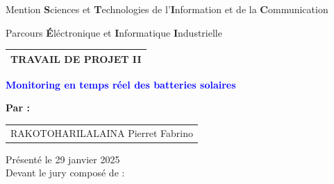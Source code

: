 \begin{titlepage}
	\begin{center}
		\begin{large}
			\large Mention {\textbf{S}ciences et \textbf{T}echnologies de l'\textbf{I}nformation et de la \textbf{C}ommunication} \\
		\end{large}
	\end{center}
	
	\begin{center}
		\begin{large}
			\large Parcours {\textbf{É}léctronique et \textbf{I}nformatique} \textbf{I}ndustrielle\\
		\end{large}
	\end{center}
	
	\vfill
	\begin{center}
		\begin{center}
			\begin{tabular}{c}
				
				
				\textbf{\small{TRAVAIL DE PROJET II}} \\
				\hline \hline
			\end{tabular}
		\end{center}
	\end{center}
	
	\vfill
	\begin{center}
		\textcolor{blue}{\Huge{\textbf{Monitoring en temps réel des batteries solaires}}} \\
	\end{center}
	
	\vfill
	\begin{center}		
		\textbf{Par :}
	\end{center}
	
	\begin{center}
		\begin{tabular}{l}
			RAKOTOHARILALAINA Pierret Fabrino
		\end{tabular}
	\end{center}
	\vfill
	\begin{center}
		Présenté le 29 janvier 2025\\
		Devant le jury composé de : \\
	\end{center}


\end{titlepage}
